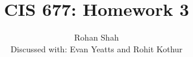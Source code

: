 \documentclass[12pt]{article}
\begin{document}
\pagestyle{plain}
\titleformat{\subsection}[runin]
  {\normalfont\large\bfseries}{\thesubsection}{1em}{}
\titleformat{\subsubsection}[runin]
  {\normalfont\large\bfseries}{\thesubsubsection}{1em}{}

\title{CIS 677: Homework 3}
\author{Rohan Shah\\Discussed with: Evan Yeatts and Rohit Kothur}
\date{}

\maketitle
\end{document}
